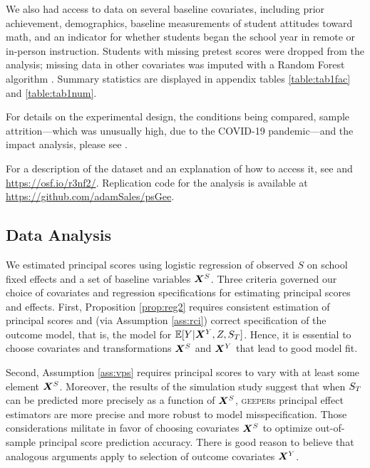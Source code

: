 \documentclass[]{article}
\begin{document}
We also had access to data on several baseline covariates, including prior achievement, demographics, baseline measurements of student attitudes toward math, and an indicator for whether students began the school year in remote or in-person instruction.
Students with missing pretest scores were dropped from the analysis; missing data in other covariates was imputed with a Random Forest algorithm \citep{missForest}. Summary statistics are displayed in appendix tables \ref{table:tab1fac} and \ref{table:tab1num}.

For details on the experimental design, the conditions being compared, sample attrition---which was unusually high, due to the COVID-19 pandemic---and the impact analysis, please see \citet{impactPaper}.

For a description of the dataset and an explanation of how to access it, see \citet{ottmar2023data} and \url{https://osf.io/r3nf2/}.
Replication code for the analysis is available at %
\url{https://github.com/adamSales/psGee}.

\subsection{Data Analysis}
We estimated principal scores using logistic regression of observed $S$ on school fixed effects and a set of baseline variables $\bm{X}^S$.
Three criteria governed our choice of covariates and regression specifications for estimating principal scores and effects.
First, Proposition \ref{prop:reg2} requires consistent estimation of principal scores and (via Assumption \ref{ass:rci}) correct specification of the outcome model, that is, the model for $\mathbb{E}[Y|\bm{X}^Y,Z,S_T]$.
Hence, it is essential to choose covariates and transformations $\bm{X}^S$ and $\bm{X}^Y$ that lead to good model fit.

Second, Assumption \ref{ass:vps} requires principal scores to vary with at least some element $\bm{X}^S$. Moreover, the results of the simulation study suggest that when $S_T$ can be predicted more precisely as a function of $\bm{X}^S$, \textsc{geeper}s principal effect estimators are more precise and more robust to model misspecification.
Those considerations militate in favor of choosing covariates $\bm{X}^S$ to optimize out-of-sample principal score prediction accuracy.
There is good reason to believe that analogous arguments apply to selection of outcome covariates $\bm{X}^Y$.
\end{document}
